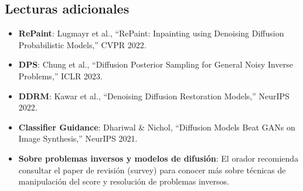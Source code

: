 \subsection{Lecturas adicionales}

\begin{itemize}
    \item \textbf{RePaint}: Lugmayr et al., ``RePaint: Inpainting using Denoising Diffusion Probabilistic Models,'' CVPR 2022.
    \item \textbf{DPS}: Chung et al., ``Diffusion Posterior Sampling for General Noisy Inverse Problems,'' ICLR 2023.
    \item \textbf{DDRM}: Kawar et al., ``Denoising Diffusion Restoration Models,'' NeurIPS 2022.
    \item \textbf{Classifier Guidance}: Dhariwal \& Nichol, ``Diffusion Models Beat GANs on Image Synthesis,'' NeurIPS 2021.
    \item \textbf{Sobre problemas inversos y modelos de difusión}: El orador recomienda consultar el paper de revisión (survey) para conocer más sobre técnicas de manipulación del score y resolución de problemas inversos.
\end{itemize}



